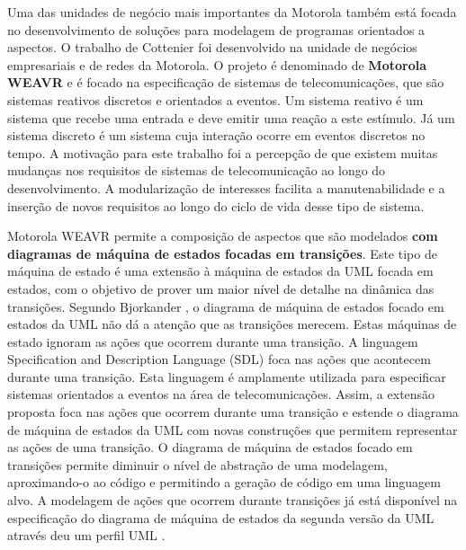 Uma das unidades de negócio mais importantes da Motorola também está focada no desenvolvimento de soluções para modelagem de programas orientados a
aspectos. O trabalho de Cottenier \cite{Cottenier06themotorola} \cite{Cottenier:2007:SAC:1229375.1229377} foi desenvolvido na unidade de negócios empresariais e de redes da
Motorola. O projeto é denominado de \textbf{Motorola WEAVR} e é focado na especificação de sistemas de telecomunicações, que são sistemas reativos
discretos e orientados a eventos. Um sistema reativo é um sistema que recebe uma entrada e deve emitir uma reação a este estímulo. Já um sistema discreto é um sistema cuja
interação ocorre em eventos discretos no tempo. A motivação para este trabalho foi a percepção de que existem muitas mudanças nos requisitos de 
sistemas de telecomunicação ao longo do desenvolvimento. A modularização de interesses facilita a manutenabilidade e a inserção de novos requisitos ao
longo do ciclo de vida desse tipo de sistema. 

Motorola WEAVR permite a composição de aspectos que são modelados \textbf{com diagramas de máquina de estados focadas em transições}. Este tipo de
máquina de estado é uma extensão à máquina de estados da UML focada em estados, com o objetivo de prover um maior nível de detalhe na dinâmica das
transições. Segundo Bjorkander \cite{Bjorkander:2000:GPU:619058.621607}, o diagrama de máquina de estados focado em estados da UML não dá a atenção
que as transições merecem. Estas máquinas de estado ignoram as ações que ocorrem durante uma transição. A linguagem Specification and Description Language
(SDL)  \cite{sdl:00} foca nas ações que acontecem durante uma transição. Esta linguagem é
amplamente utilizada para especificar sistemas orientados a eventos na área de telecomunicações. Assim, a extensão proposta foca nas ações que ocorrem
durante uma transição e estende o diagrama de máquina de estados da UML com novas construções que permitem representar as ações de uma transição. O
diagrama de máquina de estados focado em transições permite diminuir o nível de abstração de uma modelagem, aproximando-o ao código
e permitindo a geração de código em uma linguagem alvo. A modelagem de ações que ocorrem durante transições já está disponível na especificação
do diagrama de máquina de estados da segunda versão da UML através deu um perfil UML \cite{uml:05}.

